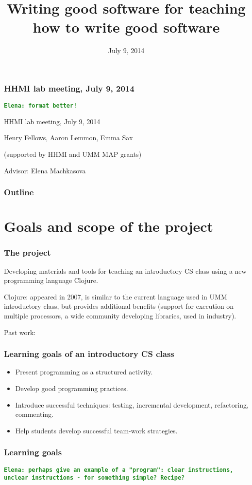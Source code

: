 \documentclass{beamer}
\newcommand{\comment}[1]{{\bf \tt  {#1}}}
\newcommand{\emcomment}[1]{\textcolor{ForestGreen}{\comment{Elena: {#1}}}}
\begin{document}
\title{Writing good software for teaching how to write good software}
\date{July 9, 2014}

\begin{frame}
\frametitle{HHMI lab meeting, July 9, 2014}
\emcomment{format better!}

{\centering
HHMI lab meeting, July 9, 2014 \par
}
Henry Fellows, Aaron Lemmon, Emma Sax\par
(supported by HHMI and UMM MAP grants)\par
Advisor: Elena Machkasova \par
\end{frame}

\begin{frame}[fragile]
\frametitle{Outline}
	\tableofcontents
\end{frame}


\section{Goals and scope of the project}

\begin{frame}[fragile]
\frametitle{The project}
Developing materials and tools for teaching an introductory CS class using a new programming language Clojure.

Clojure: appeared in 2007, is similar to the current language used in UMM introductory class, but provides additional benefits 
(support for execution on multiple processors, a wide community developing libraries, used in industry). 

Past work: 
\end{frame}

\begin{frame}[fragile]
\frametitle{Learning goals of an introductory CS class}
\begin{itemize}
\item Present programming as a structured activity.
\item Develop good programming practices.
\item Introduce successful techniques: testing, incremental development, refactoring, commenting. 
\item Help students develop successful team-work strategies. 
\end{itemize}
\end{frame}

\begin{frame}[fragile]
\frametitle{Learning goals}
\emcomment{perhaps give an example of a "program": clear instructions, unclear instructions - for something simple? Recipe?}
\end{frame}
\end{document}
